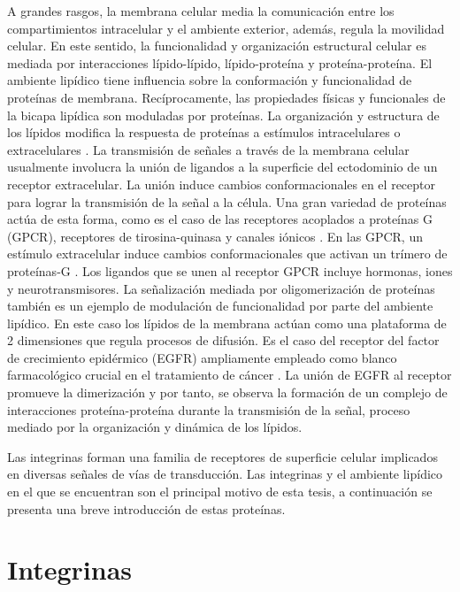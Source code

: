 A grandes rasgos, la membrana celular media la comunicación entre los compartimientos intracelular y el ambiente exterior, además, regula la movilidad celular. En este sentido, la funcionalidad y organización estructural celular es mediada por interacciones lípido-lípido, lípido-proteína y proteína-proteína. El ambiente lipídico tiene influencia sobre la conformación y funcionalidad de proteínas de membrana. Recíprocamente, las propiedades físicas y funcionales de la bicapa lipídica son moduladas por proteínas. La organización y estructura de los lípidos modifica la respuesta de proteínas a estímulos intracelulares o extracelulares \citep{Spector1985, Cullis1991, Dowhan2002}. La transmisión de señales a través de la membrana celular usualmente involucra la unión de ligandos a la superficie del ectodominio de un receptor extracelular. La unión induce cambios conformacionales en el receptor para lograr la transmisión de la señal a la célula. Una gran variedad de proteínas actúa de esta forma, como es el caso de las receptores acoplados a proteínas G (GPCR), receptores de tirosina-quinasa y canales iónicos \citep{Li2006, Kelkar2007, Lefkowitz2007, Chataigner2020, Shi2023}. En las GPCR, un estímulo extracelular induce cambios conformacionales que activan un trímero de proteínas-G \citep{Bourne1997}. Los ligandos que se unen al receptor GPCR incluye hormonas, iones y neurotransmisores. La señalización mediada por oligomerización de proteínas también es un ejemplo de modulación de funcionalidad por parte del ambiente lipídico. En este caso los lípidos de la membrana actúan como una plataforma de 2 dimensiones que regula procesos de difusión. Es el caso del receptor del factor de crecimiento epidérmico (EGFR) ampliamente empleado como blanco farmacológico crucial en el tratamiento de cáncer \citep{Brewer2013}. La unión de EGFR al receptor promueve la dimerización y por tanto, se observa la formación de un complejo de interacciones proteína-proteína durante la transmisión de la señal, proceso mediado por la organización y dinámica de los lípidos.

Las integrinas forman una familia de receptores de superficie celular implicados en diversas señales de vías de transducción. Las integrinas y el ambiente lipídico en el que se encuentran son el principal motivo de esta tesis, a continuación se presenta una breve introducción de estas proteínas.


\section{Integrinas}\label{sec:integrins}

